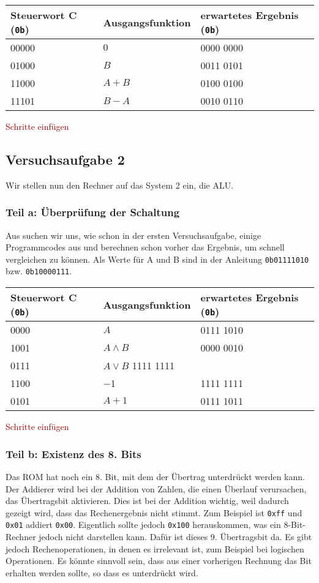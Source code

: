 \begin{tabular}{lll}
	Steuerwort C (\texttt{0b}) & Ausgangsfunktion & erwartetes Ergebnis
	(\texttt{0b}) \\
	\hline
	00000 & $0$ & 0000 0000 \\
	01000 & $B$ & 0011 0101 \\
	11000 & $A + B$ & 0100 0100 \\
	11101 & $B - A$ & 0010 0110
\end{tabular}

\textcolor{darkred}{Schritte einfügen}

\subsection{Versuchsaufgabe 2}

Wir stellen nun den Rechner auf das System 2 ein, die ALU.

\subsubsection{Teil a: Überprüfung der Schaltung}

Aus \cite[Tabelle~8.2]{physik313-Anleitung} suchen wir uns, wie schon in der
ersten Versuchsaufgabe, einige Programmcodes aus und berechnen schon vorher das
Ergebnis, um schnell vergleichen zu können. Als Werte für A und B sind in der
Anleitung \texttt{0b01111010} bzw. \texttt{0b10000111}.

\begin{tabular}{lll}
	Steuerwort C (\texttt{0b}) & Ausgangsfunktion & erwartetes Ergebnis
	(\texttt{0b}) \\
	\hline
	0000 & $A$ & 0111 1010 \\
	1001 & $A \wedge B$ & 0000 0010 \\
	0111 & $A \vee B$ 1111 1111 \\
	1100 & \num{-1} & 1111 1111 \\
	0101 & $A + 1$ & 0111 1011
\end{tabular}

\textcolor{darkred}{Schritte einfügen}

\subsubsection{Teil b: Existenz des 8. Bits}

Das ROM hat noch ein 8. Bit, mit dem der Übertrag unterdrückt werden kann. Der
Addierer wird bei der Addition von Zahlen, die einen Überlauf verursachen, das
Übertragsbit aktivieren. Dies ist bei der Addition wichtig, weil dadurch
gezeigt wird, dass das Rechenergebnis nicht stimmt. Zum Beispiel ist
\texttt{0xff} und \texttt{0x01} addiert \texttt{0x00}. Eigentlich sollte jedoch
\texttt{0x100} herauskommen, was ein 8-Bit-Rechner jedoch nicht darstellen
kann. Dafür ist dieses 9. Übertragsbit da. Es gibt jedoch Rechenoperationen, in
denen es irrelevant ist, zum Beispiel bei logischen Operationen. Es könnte
sinnvoll sein, dass aus einer vorherigen Rechnung das Bit erhalten werden
sollte, so dass es unterdrückt wird.

